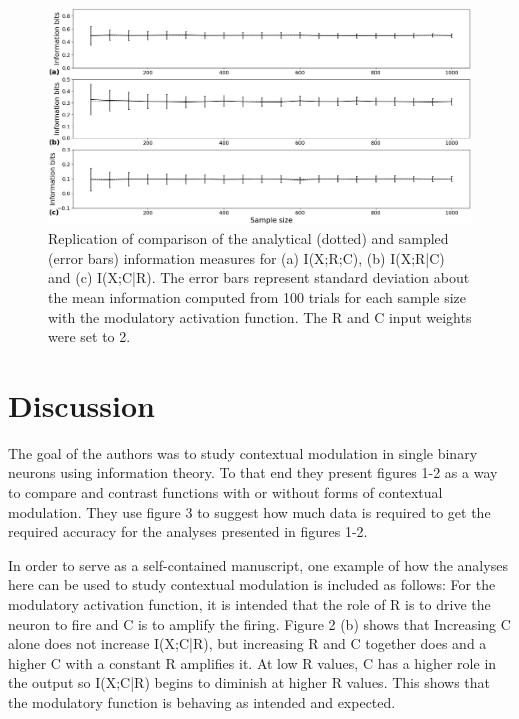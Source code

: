 \begin{figure}[H]
    \includegraphics[width=\textwidth]{figure_3.png}
      \caption{Replication of comparison of the analytical (dotted) and sampled (error bars) information measures for (a) I(X;R;C), (b) I(X;R|C) and (c) I(X;C|R). The error bars represent standard deviation about the mean information computed from 100 trials for each sample size with the modulatory activation function. The R and C input weights were set to 2.}
\end{figure}

\section{Discussion}

The goal of the authors was to study contextual modulation in single binary neurons using information theory. To that end they present figures 1-2 as a way to compare and contrast functions with or without forms of contextual modulation. They use figure 3 to suggest how much data is required to get the required accuracy for the analyses presented in figures 1-2. \newline

In order to serve as a self-contained manuscript, one example of how the analyses here can be used to study contextual modulation is included as follows: For the modulatory activation function, it is intended that the role of R is to drive the neuron to fire and C is to amplify the firing. Figure 2 (b) shows that Increasing C alone does not increase I(X;C|R), but increasing R and C together does and a higher C with a constant R amplifies it. At low R values, C has a higher role in the output so I(X;C|R) begins to diminish at higher R values. This shows that the modulatory function is behaving as intended and expected. \newline

